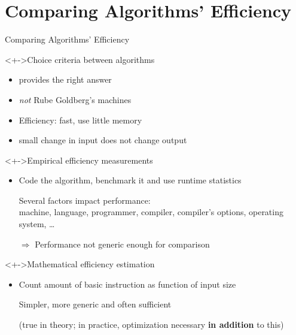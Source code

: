 \section{Comparing Algorithms' Efficiency}\sectionpage
\begin{frame}{Comparing Algorithms' Efficiency}
  \begin{block}<+->{Choice criteria between algorithms}
    \begin{itemize}
    \item {} provides the right answer
    \item {} \textit{not} Rube Goldberg's machines 
    \item \alert{Efficiency:} fast, use little memory
    \item {} small change in input does not change output
    \end{itemize}
  \end{block}\vspace{-.5\baselineskip}

  \begin{block}<+->{Empirical efficiency measurements}
    \begin{itemize}
    \item Code the algorithm, benchmark it and use runtime statistics
    \item[\Frownie] Several factors impact performance: \\
      {\small machine, language, programmer, compiler, compiler's options,
      operating system, \ldots}
    \item[$\Rightarrow$] Performance not generic enough for comparison
    \end{itemize}
  \end{block}\vspace{-.5\baselineskip}

  \begin{block}<+->{Mathematical efficiency estimation}
    \begin{itemize}
    \item Count amount of basic instruction as function of input size
    \item[\Smiley] Simpler, more generic and often sufficient
    \item[] {\small(true in theory;
      in practice, optimization necessary \textbf{in addition} to this)}
    \end{itemize}
  \end{block}
\end{frame}
